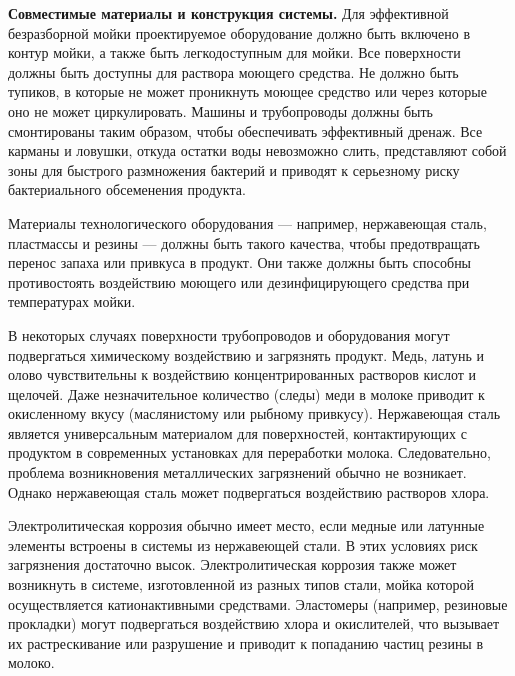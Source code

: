 {\par \redline \textbf{Совместимые материалы и конструкция системы.} Для эффективной безразборной мойки проектируемое оборудование должно быть включено в контур мойки, а также быть легкодоступным для мойки. Все поверхности должны быть доступны для раствора моющего средства. Не должно быть тупиков, в которые не может проникнуть моющее средство или через которые оно не может циркулировать. Машины и трубопроводы должны быть смонтированы таким образом, чтобы обеспечивать эффективный дренаж. Все карманы и ловушки, откуда остатки воды невозможно слить, представляют собой зоны для быстрого размножения бактерий и приводят к серьезному риску бактериального обсеменения продукта.



\par \redline Материалы технологического оборудования — например, нержавеющая сталь, пластмассы и резины — должны быть такого качества, чтобы предотвращать перенос запаха или привкуса в продукт. Они также должны быть способны противостоять воздействию моющего или дезинфицирующего средства при температурах мойки.



\par \redline В некоторых случаях поверхности трубопроводов и оборудования могут подвергаться химическому воздействию и загрязнять продукт. Медь, латунь и олово чувствительны к воздействию концентрированных растворов кислот и щелочей. Даже незначительное количество (следы) меди в молоке приводит к окисленному вкусу (маслянистому или рыбному привкусу). Нержавеющая сталь является универсальным материалом для поверхностей, контактирующих с продуктом в современных установках для переработки молока. Следовательно, проблема возникновения металлических загрязнений обычно не возникает. Однако нержавеющая сталь может подвергаться воздействию растворов хлора.

\par \redline Электролитическая коррозия обычно имеет место, если медные или латунные элементы встроены в системы из нержавеющей стали. В этих условиях риск загрязнения достаточно высок. Электролитическая коррозия также может возникнуть в системе, изготовленной из разных типов стали, мойка которой осуществляется катионактивными средствами. Эластомеры (например, резиновые прокладки) могут подвергаться воздействию хлора и окислителей, что вызывает их растрескивание или разрушение и приводит к попаданию частиц резины в молоко.



}
